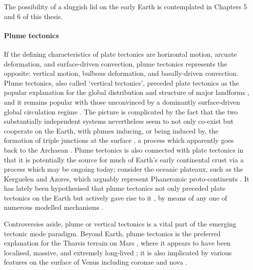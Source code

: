 \documentclass[a4paper,11pt,oneside]{book}
\begin{document}
The possibility of a sluggish lid on the early Earth is contemplated in Chapters 5 and 6 of this thesis.

\paragraph{Plume tectonics}

If the defining characteristics of plate tectonics are horizontal motion, arcuate deformation, and surface-driven convection, plume tectonics represents the opposite: vertical motion, bulbous deformation, and basally-driven convection. Plume tectonics, also called `vertical tectonics', preceded plate tectonics as the popular explanation for the global distribution and structure of major landforms \cite{Van_Bemmelen1976-yx}, and it remains popular with those unconvinced by a dominantly surface-driven global circulation regime \citet{Maruyama1994-pq, Kumazawa1994-jl, Tsuchiya2013-kq}. The picture is complicated by the fact that the two substantially independent systems \cite{Hill1992-dq} nevertheless seem to not only co-exist but cooperate on the Earth, with plumes inducing, or being induced by, the formation of triple junctions at the surface \cite{Burke1973-zb}, a process which apparently goes back to the Archaean \cite{Van_Kranendonk2010-vc}. Plume tectonics is also connected with plate tectonics in that it is potentially the source for much of Earth's early continental crust \citet{Hill1991-cq, Walzer2017-mu} via a process which may be ongoing today; consider the oceanic plateaux, such as the Kerguelen and Azores, which arguably represent Phanerozoic proto-continents \citet{Albarede1998-kx, Condie2000-ta, Aulbach2012-bl}. It has lately been hypothesised that plume tectonics not only preceded plate tectonics on the Earth \cite{Fischer2016-uv} but actively gave rise to it \cite{Gerya2015-ip}, by means of any one of numerous modelled mechanisms \citet{Mason2010-ym, Rey2014-ra}.

Controversies aside, plume or vertical tectonics is a vital part of the emerging tectonic mode paradigm. Beyond Earth, plume tectonics is the preferred explanation for the Tharsis terrain on Mars \citet{Mege1996-pv, Ernst2001-dv, Baker2007-nt, Dohm2007-am, Hynek2011-zd}, where it appears to have been localised, massive, and extremely long-lived \cite{Werner2009-xo}; it is also implicated by various features on the surface of Venus including coronae and nova \citet{Schubert1989-gp, Stofan1992-sl, Smrekar1997-xq, Johnson2003-dm, Ernst2004-li, Stofan2005-sx}.
\end{document}
